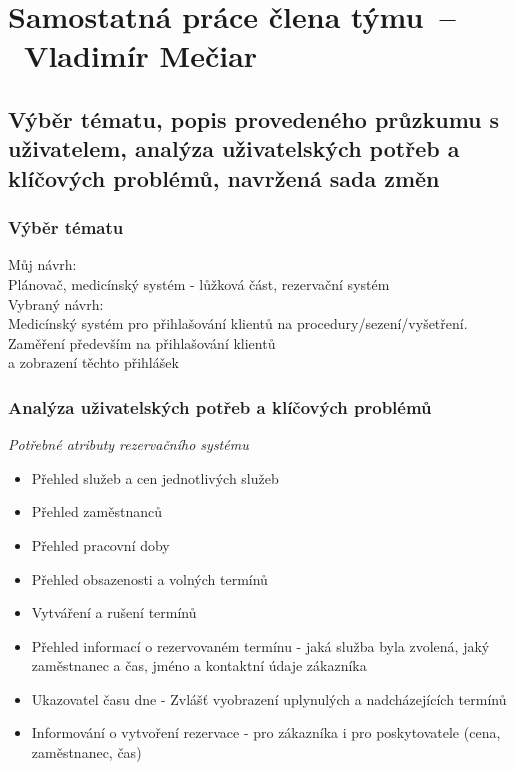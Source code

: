 \section{Samostatná práce člena týmu\ --\ Vladimír Mečiar}
\label{sec:individual_work}

\subsection{Výběr tématu, popis provedeného průzkumu s uživatelem, analýza
uživatelských potřeb a klíčových problémů, navržená sada změn}

\subsubsection*{Výběr tématu}
\large{ Můj návrh:} \\
Plánovač, medicínský systém - lůžková část, rezervační systém \\
\noindent\large{ Vybraný návrh: }\\
Medicínský systém pro přihlašování klientů na procedury/sezení/vyšetření. Zaměření především na přihlašování klientů \\
a zobrazení těchto přihlášek

\subsubsection*{Analýza uživatelských potřeb a klíčových problémů}
\noindent\emph{Potřebné atributy rezervačního systému}
\begin{itemize}
    \item Přehled služeb a cen jednotlivých služeb
    \item Přehled zaměstnanců
    \item Přehled pracovní doby
    \item Přehled obsazenosti a volných termínů
    \item Vytváření a rušení termínů
    \item Přehled informací o rezervovaném termínu - jaká služba byla zvolená, jaký zaměstnanec a čas, jméno a kontaktní údaje zákazníka
    \item Ukazovatel času dne - Zvlášť vyobrazení uplynulých a nadcházejících termínů
    \item Informování o vytvoření rezervace - pro zákazníka i pro poskytovatele (cena, zaměstnanec, čas)
\end{itemize}
\newpage

